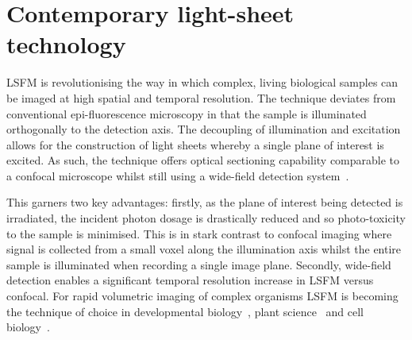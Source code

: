 \ifpdf
    \graphicspath{{Chapters/literature/Figs/Raster/}{Chapters/literature/Figs/PDF/}{Chapters/literature/Figs/}}
\else
    \graphicspath{{Chapters/literature/Figs/Vector/}{Chapters/Figs/}}
\fi



\chapter{Contemporary \gls{light-sheet} technology}\label{chapter:literature}

\gls{LSFM} is revolutionising the way in which complex, living biological samples can be imaged at high spatial and temporal resolution. %
The technique deviates from conventional \gls{epi-fluorescence} microscopy in that the sample is illuminated orthogonally to the detection axis.
The decoupling of illumination and excitation allows for the construction of light sheets whereby a single plane of interest is excited.%
As such, the technique offers \gls{optical sectioning} capability comparable to a \gls{confocal microscope} whilst still using a \gls{wide-field} detection system~\cite{siedentpf_uber_1903,voie_orthogonal-plane_1993,huisken_optical_2004-1}.

This garners two key advantages: firstly, as the plane of interest being detected is irradiated, the incident photon dosage is drastically reduced and so photo-toxicity to the sample is minimised.%
This is in stark contrast to confocal imaging where signal is collected from a small voxel along the illumination axis whilst the entire sample is illuminated when recording a single image plane.
Secondly, \gls{wide-field} detection enables a significant temporal resolution increase in \gls{LSFM} versus confocal.
For rapid volumetric imaging of complex organisms \gls{LSFM} is becoming the technique of choice in developmental biology~\cite{keller_fast_2010,verveer_high-resolution_2007,mickoleit_high-resolution_2014,icha_using_2016,keller_visualizing_2015,ichikawa_live_2014}, plant science~\cite{wangenheim_rules_2016} and cell biology~\cite{capoulade_quantitative_2011,cella_zanacchi_live-cell_2011}.


